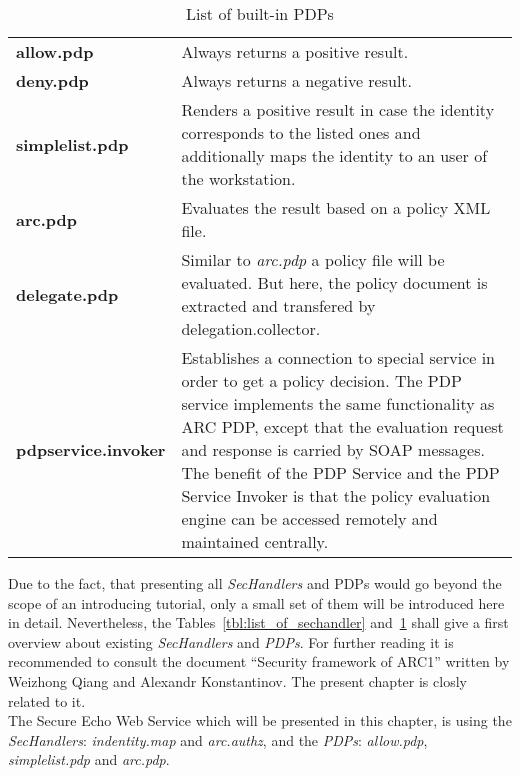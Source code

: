   \begin{table}[htb]
  \centering
  \caption{List of built-in PDPs}
\label{tbl:list_of_pdps}
  \begin{tabular*}{\textwidth}[t]{p{4cm}p{11cm}}
	\hline
 	\textbf{allow.pdp}           & Always returns a positive result.\\
	\textbf{deny.pdp}            & Always returns a negative result.\\
 	\textbf{simplelist.pdp}      & Renders a positive result in case the identity corresponds to the listed ones and additionally 
                                       maps the identity to an user of the workstation.\\
 	\textbf{arc.pdp}             & Evaluates the result based on a policy XML file.\\
 	\textbf{delegate.pdp}        & Similar to \textit{arc.pdp} a policy file will be evaluated. But here, the policy document is 
                                       extracted and transfered
                                       by delegation.collector.\\
 	\textbf{pdpservice.invoker}  & Establishes a connection to special service in order to get a policy decision. The PDP service 
                                       implements the same functionality as ARC PDP, except that the evaluation request and 
                                       response is carried by SOAP messages. The benefit of the PDP Service and the PDP Service
                                       Invoker is that the policy evaluation engine can be accessed remotely and maintained centrally.
\\
	\hline
  \end{tabular*}
  \end{table}
%
%
Due to the fact, that presenting all \textit{SecHandlers} and PDPs would go beyond the scope of an introducing tutorial, only a small set of them will be introduced here in detail. 
Nevertheless, the Tables~\ref{tbl:list_of_sechandler} and~\ref{tbl:list_of_pdps} shall give a first overview about existing \textit{SecHandlers} and \textit{PDPs}. For further reading it is recommended to consult the document ``Security framework of ARC1'' written by Weizhong Qiang and Alexandr Konstantinov. The present chapter is closly related to it.\\


The Secure Echo Web Service which will be presented in this chapter, is using the \textit{SecHandlers}: \textit{indentity.map} and \textit{arc.authz}, and the \textit{PDPs}: \textit{allow.pdp}, \textit{simplelist.pdp} and \textit{arc.pdp}. \\



